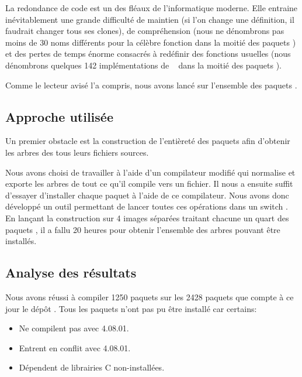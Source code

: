 
La redondance de code est un des fléaux de l'informatique moderne. Elle entraine inévitablement une grande difficulté de maintien (si l'on change une définition, il faudrait changer tous ses clones), de compréhension (nous ne dénombrons pas moins de 30 noms différents pour la célèbre fonction  dans la moitié des paquets \Opam) et des pertes de temps énorme consacrés à redéfinir des fonctions usuelles (nous dénombrons quelques 142 implémentations de ~  dans la moitié des paquets \Opam).

Comme le lecteur avisé l'a compris, nous avons lancé {\Asak} sur l'ensemble des paquets {\Opam}.

\subsection{Approche utilisée}

Un premier obstacle est la construction de l'entièreté des paquets {\Opam} afin d'obtenir les arbres {\LambdaCode} des tous leurs fichiers sources.

Nous avons choisi de travailler à l'aide d'un compilateur modifié qui normalise et exporte les arbres {\LambdaCode} de tout ce qu'il compile vers un fichier. Il nous a ensuite suffit d'essayer d'installer chaque paquet {\Opam} à l'aide de ce compilateur. Nous avons donc développé un outil permettant de lancer toutes ces opérations dans un switch {\Opam}. En lançant la construction sur 4 images {\Docker} séparées traitant chacune un quart des paquets {\Opam}, il a fallu 20 heures pour obtenir l'ensemble des arbres {\LambdaCode} pouvant être installés.

\subsection{Analyse des résultats}

Nous avons réussi à compiler 1250 paquets sur les 2428 paquets que compte à ce jour le dépôt {\Opam}. Tous les paquets n'ont pas pu être installé car certains:

\begin{itemize}
\item Ne compilent pas avec {\OCaml} 4.08.01.
\item Entrent en conflit avec {\OCaml} 4.08.01.
\item Dépendent de librairies C non-installées.
\end{itemize}

